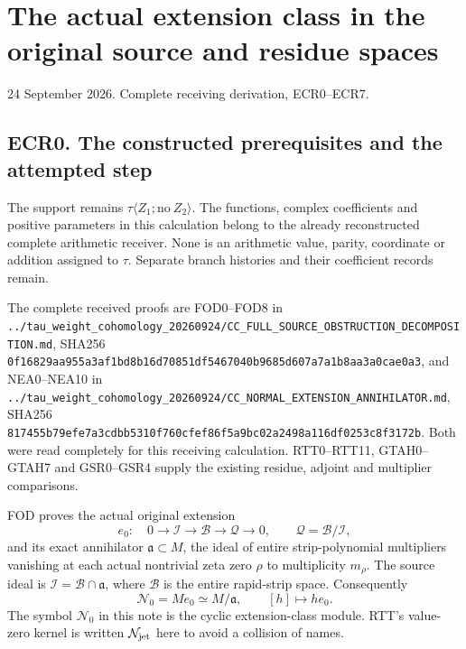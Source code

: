 \section{The actual extension class in the original source and residue
spaces}\label{the-actual-extension-class-in-the-original-source-and-residue-spaces}

24 September 2026. Complete receiving derivation, ECR0--ECR7.

\subsection{ECR0. The constructed prerequisites and the attempted
step}\label{ecr0.-the-constructed-prerequisites-and-the-attempted-step}

The support remains \(\tau\langle Z_1;\mathrm{no}\ Z_2\rangle\). The
functions, complex coefficients and positive parameters in this
calculation belong to the already reconstructed complete arithmetic
receiver. None is an arithmetic value, parity, coordinate or addition
assigned to \(\tau\). Separate branch histories and their coefficient
records remain.

The complete received proofs are FOD0--FOD8 in
\nolinkurl{../tau_weight_cohomology_20260924/CC_FULL_SOURCE_OBSTRUCTION_DECOMPOSITION.md},
SHA256
\nolinkurl{0f16829aa955a3af1bd8b16d70851df5467040b9685d607a7a1b8aa3a0cae0a3},
and NEA0--NEA10 in
\nolinkurl{../tau_weight_cohomology_20260924/CC_NORMAL_EXTENSION_ANNIHILATOR.md},
SHA256
\nolinkurl{817455b79efe7a3cdbb5310f760cfef86f5a9bc02a2498a116df0253c8f3172b}.
Both were read completely for this receiving calculation. RTT0--RTT11,
GTAH0--GTAH7 and GSR0--GSR4 supply the existing residue, adjoint and
multiplier comparisons.

FOD proves the actual original extension \[
e_0:\quad0\longrightarrow\mathcal I\longrightarrow\mathcal B
\longrightarrow\mathcal Q\longrightarrow0,
\qquad \mathcal Q=\mathcal B/\mathcal I,
\tag{ECR0.1}
\] and its exact annihilator \(\mathfrak a\subset M\), the ideal of
entire strip-polynomial multipliers vanishing at each actual nontrivial
zeta zero \(\rho\) to multiplicity \(m_\rho\). The source ideal is
\(\mathcal I=\mathcal B\cap\mathfrak a\), where \(\mathcal B\) is the
entire rapid-strip space. Consequently \[
\mathscr N_0=M e_0\simeq M/\mathfrak a,\qquad [h]\longmapsto h e_0.
\tag{ECR0.2}
\] The symbol \(\mathscr N_0\) in this note is the cyclic
extension-class module. RTT's value-zero kernel is written
\(\mathcal N_{\rm jet}\) here to avoid a collision of names.

